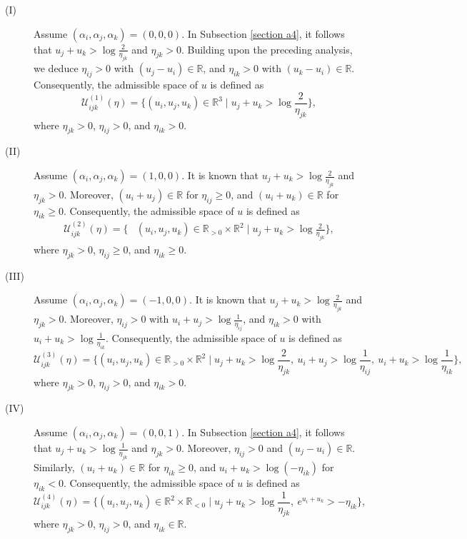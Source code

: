 \documentclass[12pt]{amsart}
\theoremstyle{definition}
\begin{document}
\begin{description}
\item[(I)]
Assume $(\alpha_i,\alpha_j,\alpha_k)=(0,0,0)$.
In Subsection \ref{section a4}, it follows that $u_j+u_k>\log \frac{2}{\eta_{jk}}$ and $\eta_{jk}>0$.
Building upon the preceding analysis, we deduce $\eta_{ij}>0$ with $(u_j-u_i)\in \mathbb{R}$, and $\eta_{ik}>0$ with $(u_k-u_i)\in \mathbb{R}$.
Consequently, the admissible space of $u$ is defined as
\begin{equation}\label{Eq: F4}
\mathcal{U}^{(1)}_{ijk}(\eta)
=\{(u_i,u_j,u_k)\in \mathbb{R}^3\mid u_j+u_k>\log \frac{2}{\eta_{jk}}\},
\end{equation}
where $\eta_{jk}>0$, $\eta_{ij}>0$, and $\eta_{ik}>0$.

\item[(II)]
Assume $(\alpha_i,\alpha_j,\alpha_k)=(1,0,0)$.
It is known that $u_j+u_k>\log \frac{2}{\eta_{jk}}$ and $\eta_{jk}>0$.
Moreover, $(u_i+u_j)\in \mathbb{R}$ for $\eta_{ij}\geq0$, and $(u_i+u_k)\in \mathbb{R}$ for $\eta_{ik}\geq0$.
Consequently, the admissible space of $u$ is defined as
\begin{equation}\label{Eq: F5}
\begin{aligned}
\mathcal{U}^{(2)}_{ijk}(\eta)
=\{&(u_i,u_j,u_k)\in \mathbb{R}_{>0}\times\mathbb{R}^2 \mid u_j+u_k>\log \frac{2}{\eta_{jk}}\},
\end{aligned}
\end{equation}
where $\eta_{jk}>0$, $\eta_{ij}\geq 0$, and $\eta_{ik}\geq0$.

\item[(III)]
Assume $(\alpha_i,\alpha_j,\alpha_k)=(-1,0,0)$.
It is known that $u_j+u_k>\log \frac{2}{\eta_{jk}}$ and $\eta_{jk}>0$.
Moreover, $\eta_{ij}>0$ with $u_i+u_j>\log\frac{1}{\eta_{ij}}$, and
$\eta_{ik}>0$ with $u_i+u_k>\log\frac{1}{\eta_{ik}}$.
Consequently, the admissible space of $u$ is defined as
\begin{equation*}
\mathcal{U}^{(3)}_{ijk}(\eta)
=\{(u_i,u_j,u_k)\in \mathbb{R}_{>0}\times\mathbb{R}^2\mid u_j+u_k>\log \frac{2}{\eta_{jk}},\ u_i+u_j>\log\frac{1}{\eta_{ij}},\ u_i+u_k>\log\frac{1}{\eta_{ik}}\},
\end{equation*}
where $\eta_{jk}>0$, $\eta_{ij}>0$, and $\eta_{ik}>0$.

\item[(IV)]
Assume $(\alpha_i,\alpha_j,\alpha_k)=(0,0,1)$.
In Subsection \ref{section a4}, it follows that $u_j+u_k>\log \frac{1}{\eta_{jk}}$ and $\eta_{jk}>0$.
Moreover, $\eta_{ij}>0$ and $(u_j-u_i)\in \mathbb{R}$.
Similarly, $(u_i+u_k)\in \mathbb{R}$ for $\eta_{ik}\geq0$, and $u_i+u_k>\log(-\eta_{ik})$ for $\eta_{ik}<0$.
Consequently, the admissible space of $u$ is defined as
\begin{equation}\label{AS4}
\mathcal{U}^{(4)}_{ijk}(\eta)
=\{(u_i,u_j,u_k)\in \mathbb{R}^2\times\mathbb{R}_{<0}\mid u_j+u_k>\log \frac{1}{\eta_{jk}},\  e^{u_i+u_k}>-\eta_{ik}\},
\end{equation}
where $\eta_{jk}>0$, $\eta_{ij}>0$, and $\eta_{ik}\in \mathbb{R}$.


\end{description}
\end{document}
